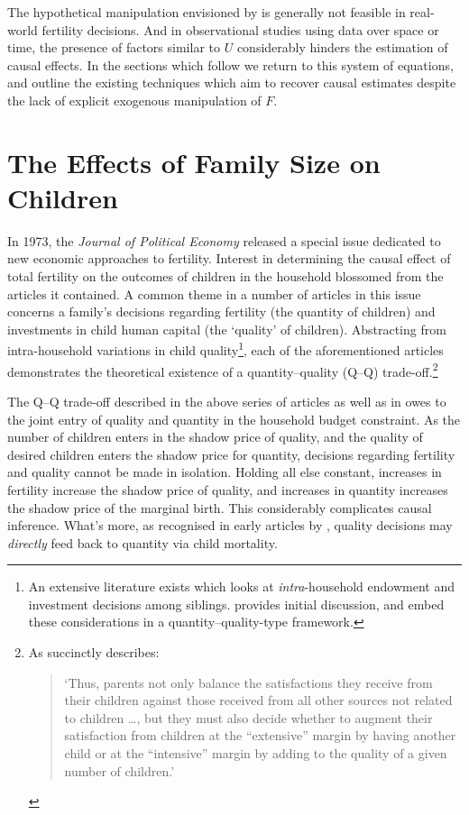 The hypothetical manipulation envisioned by \citeauthor{Haavelmo1943} is 
generally not feasible in real-world fertility decisions. And in observational
studies using data over space or time, the presence of factors similar to $U$
considerably hinders the estimation of causal effects.  In the sections which
follow we return to this system of equations, and outline the existing 
techniques which aim to recover causal estimates despite the lack of explicit 
exogenous manipulation of $F$.

\section{The Effects of Family Size on Children}
\label{Fscn:kids}
In 1973, the \emph{Journal of Political Economy} released a special issue 
dedicated to new economic approaches to fertility.  Interest in determining
the causal effect of total fertility on the outcomes of children in the 
household blossomed from the articles it contained.  A common theme in a number 
of articles in this issue \citep{BeckerLewis1973, DeTray1973, Willis1973} 
concerns a family's decisions regarding fertility (the quantity of children) 
and investments in child human capital (the `quality' of children). Abstracting 
from intra-household variations in child quality\footnote{An extensive 
literature exists which looks at \emph{intra}-household endowment and investment
decisions among siblings.  \citet{Behrmanetal1982} provides initial discussion,
and \citet{AizerCunha2012} embed these considerations in a quantity--quality-type 
framework.}, each of the aforementioned articles demonstrates the theoretical 
existence of a quantity--quality (Q--Q) trade-off.\footnote{As \citet{Willis1973} 
succinctly describes:
\begin{quote}
`Thus, parents not only balance the satisfactions they receive from their
children against those received from all other sources not related to 
children \ldots, but they must also decide whether to augment their 
satisfaction from children at the ``extensive'' margin by having another
child or at the ``intensive'' margin by adding to the quality of a given
number of children.'
\end{quote}
}

The Q--Q trade-off described in the above series of articles as well as in
\citet{BeckerTomes1976,BeckerTomes1986} owes to the joint entry of quality and 
quantity in the household budget constraint.  As the number of children 
enters in the shadow price of quality, and the quality of desired children 
enters the shadow price for quantity, decisions regarding fertility and quality 
cannot be made in isolation.  Holding all else constant, increases in fertility 
increase the shadow price of quality, and increases in quantity increases the
shadow price of the marginal birth. This considerably complicates causal 
inference. What's more, as recognised in early articles by \citet{%
BenPorathWelch1972,BenPorath1976}, quality decisions may \emph{directly} feed
back to quantity via child mortality.

